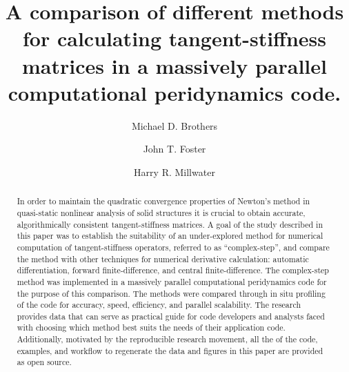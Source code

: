 \documentclass[preprint,12pt]{elsarticle}
\begin{document}
\sloppy

\begin{frontmatter}


\author{Michael D. Brothers}
\author{John T. Foster}

\author{Harry R. Millwater\corref{}}
\address{Mechanical Engineering Department, The University of Texas at San Antonio}


\title{A comparison of different methods for calculating tangent-stiffness matrices in a massively parallel computational peridynamics code.}


\begin{abstract} %

In order to maintain the quadratic convergence properties of Newton's method in
quasi-static nonlinear analysis of solid structures it is crucial to obtain
accurate, algorithmically consistent tangent-stiffness matrices. A goal of the
study described in this paper was to establish the suitability of an
under-explored method for numerical computation of tangent-stiffness operators,
referred to as ``complex-step'', and compare the 
 method with other techniques for numerical derivative
calculation: automatic differentiation, forward finite-difference, and central
finite-difference. The complex-step method was   implemented in a massively
parallel computational peridynamics code for the purpose of this comparison.
The methods were compared through in situ profiling of the code for accuracy,
speed, efficiency, and parallel scalability. The research provides data that
can serve as practical guide for code developers and analysts faced with
choosing which method best suits the needs of their application code.
Additionally, motivated by the reproducible research movement, all the of the
code, examples, and workflow to regenerate the data and figures in this paper
are provided as open source.



\end{abstract}
\end{frontmatter}
\end{document}
